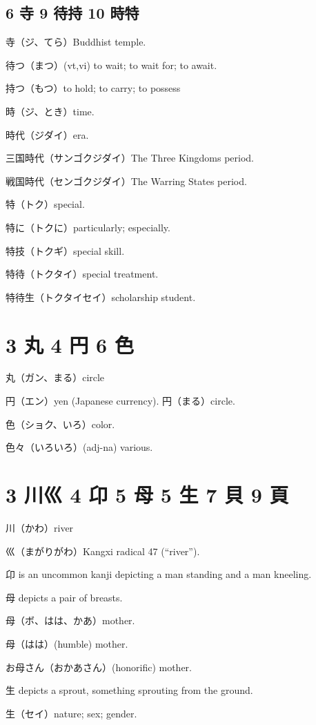 \subsection{6 寺 9 待持 10 時特}

寺（ジ、てら）Buddhist temple.

待つ（まつ）(vt,vi) to wait; to wait for; to await.

持つ（もつ）to hold; to carry; to possess

時（ジ、とき）time.

時代（ジダイ）era.

三国時代（サンゴクジダイ）The Three Kingdoms period.

戦国時代（センゴクジダイ）The Warring States period.

特（トク）special.

特に（トクに）particularly; especially.

特技（トクギ）special skill.

特待（トクタイ）special treatment.

特待生（トクタイセイ）scholarship student.

\section{3 丸 4 円 6 色}

丸（ガン、まる）circle

円（エン）yen (Japanese currency).
円（まる）circle.

色（ショク、いろ）color.

色々（いろいろ）(adj-na) various.

\section{3 川巛 4 卬 5 母 5 生 7 貝 9 頁}

川（かわ）river

巛（まがりがわ）Kangxi radical 47 (``river'').

卬 is an uncommon kanji depicting a man standing and a man kneeling.

母 depicts a pair of breasts.

母（ボ、はは、かあ）mother.

母（はは）(humble) mother.

お母さん（おかあさん）(honorific) mother.

生 depicts a sprout, something sprouting from the ground.

生（セイ）nature; sex; gender.

